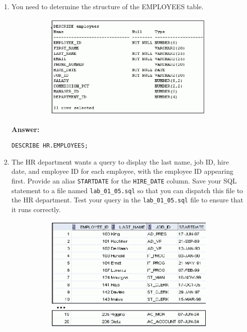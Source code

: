 \documentclass[a4paper,12pt]{article}
\begin{document}
\begin{enumerate}[start=4]
    \newpage
    \item You need to determine the structure of the EMPLOYEES table.
    \begin{figure}[h]
        \centering
        \begin{subfigure}[b]{0.3\linewidth}
            \centering
            \includegraphics[width=1.5\linewidth]{graphics/5.png}
        \end{subfigure}
    \end{figure}
    
    \textbf{Answer: }
    \begin{lstlisting}[language=SQL]
DESCRIBE HR.EMPLOYEES;
    \end{lstlisting}
    
    \item The HR department wants a query to display the last name, job ID, hire date, and employee ID for each employee, with the employee ID appearing first. Provide an alias \texttt{STARTDATE} for the \texttt{HIRE\_DATE} column. Save your SQL statement to a file named \texttt{lab\_01\_05.sql} so that you can dispatch this file to the HR department.
    Test your query in the \texttt{lab\_01\_05.sql} file to ensure that it runs correctly.
    \begin{figure}[h]
        \centering
        \begin{subfigure}[b]{0.45\linewidth}
            \centering
            \includegraphics[width=\linewidth]{graphics/6.png}
        \end{subfigure}
    \end{figure}
    

\end{enumerate}
\end{document}

